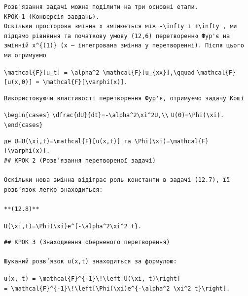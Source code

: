 \documentclass[
  ukrainian,
]{article}
\begin{document}
\begin{verbatim}
Розв'язання задачі можна поділити на три основні етапи.
КРОК 1 (Конверсія завдань).
Оскільки просторова змінна x змінюється між -\infty і +\infty , ми піддамо рівняння та початкову умову (12,6) перетворенню Фур'є на змінній x^{(1)} (x — інтегрована змінна у перетворенні). Після цього ми отримуємо
\end{verbatim}

\texttt{\textbackslash{}mathcal\{F\}{[}u\_t{]}\ =\ \textbackslash{}alpha\^{}2\ \textbackslash{}mathcal\{F\}{[}u\_\{xx\}{]},\textbackslash{}qquad}
\texttt{\textbackslash{}mathcal\{F\}{[}u(x,0){]}\ =\ \textbackslash{}mathcal\{F\}{[}\textbackslash{}varphi(x){]}.}

\begin{verbatim}
Використовуючи властивості перетворення Фур'є, отримуємо задачу Коші
\end{verbatim}

\texttt{\textbackslash{}begin\{cases\}}
\texttt{\textbackslash{}dfrac\{dU\}\{dt\}=-\textbackslash{}alpha\^{}2\textbackslash{}xi\^{}2U,\textbackslash{}\textbackslash{}}
\texttt{U(0)=\textbackslash{}Phi(\textbackslash{}xi).}
\texttt{\textbackslash{}end\{cases\}}

\begin{verbatim}
де U=U(\xi,t)=\mathcal{F}[u(x,t)] та \Phi(\xi)=\mathcal{F}[\varphi(x)].
## КРОК 2 (Розв’язання перетвореної задачі)

Оскільки нова змінна відіграє роль константи в задачі (12.7), її розв’язок легко знаходиться:

**(12.8)**
\end{verbatim}

\texttt{U(\textbackslash{}xi,t)=\textbackslash{}Phi(\textbackslash{}xi)e\^{}\{-\textbackslash{}alpha\^{}2\textbackslash{}xi\^{}2\ t\}.}

\begin{verbatim}
## КРОК 3 (Знаходження оберненого перетворення)

Шуканий розв’язок u(x,t) знаходиться за формулою:
\end{verbatim}

\texttt{u(x,\ t)\ =\ \textbackslash{}mathcal\{F\}\^{}\{-1\}\textbackslash{}!\textbackslash{}left{[}U(\textbackslash{}xi,\ t)\textbackslash{}right{]}}
\texttt{=\ \textbackslash{}mathcal\{F\}\^{}\{-1\}\textbackslash{}!\textbackslash{}left{[}\textbackslash{}Phi(\textbackslash{}xi)e\^{}\{-\textbackslash{}alpha\^{}2\ \textbackslash{}xi\^{}2\ t\}\textbackslash{}right{]}.}
\end{document}
